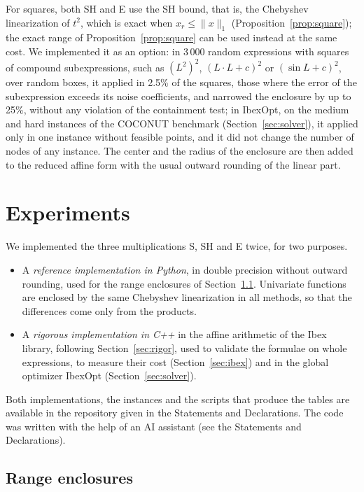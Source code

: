 \documentclass[10pt]{article}
\theoremstyle{definition}
\begin{document}
For squares, both SH and E use the SH bound, that is, the Chebyshev linearization of $t^2$, which is exact when $x_r\le\|x\|_1$ (Proposition~\ref{prop:square}); the exact range of Proposition~\ref{prop:square} can be used instead at the same cost. We implemented it as an option: in 3\,000 random expressions with squares of compound subexpressions, such as $(L^2)^2$, $(L\cdot L+c)^2$ or $(\sin L+c)^2$, over random boxes, it applied in 2.5\% of the squares, those where the error of the subexpression exceeds its noise coefficients, and narrowed the enclosure by up to 25\%, without any violation of the containment test; in IbexOpt, on the medium and hard instances of the COCONUT benchmark (Section~\ref{sec:solver}), it applied only in one instance without feasible points, and it did not change the number of nodes of any instance. The center and the radius of the enclosure are then added to the reduced affine form with the usual outward rounding of the linear part.

\section{Experiments}
\label{sec:experiments}

We implemented the three multiplications S, SH and E twice, for two purposes.
\begin{itemize}
\item A \emph{reference implementation in Python}, in double precision without outward rounding, used for the range enclosures of Section~\ref{sec:ranges}. Univariate functions are enclosed by the same Chebyshev linearization in all methods, so that the differences come only from the products.
\item A \emph{rigorous implementation in C++} in the affine arithmetic of the Ibex library, following Section~\ref{sec:rigor}, used to validate the formulae on whole expressions, to measure their cost (Section~\ref{sec:ibex}) and in the global optimizer IbexOpt (Section~\ref{sec:solver}).
\end{itemize}
Both implementations, the instances and the scripts that produce the tables are available in the repository given in the Statements and Declarations. The code was written with the help of an AI assistant (see the Statements and Declarations).

\subsection{Range enclosures}
\label{sec:ranges}
\end{document}
